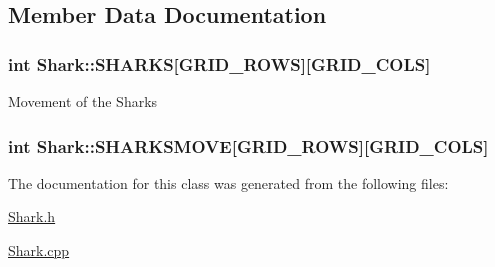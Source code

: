 \subsection{Member Data Documentation}
\subsubsection[{\texorpdfstring{S\+H\+A\+R\+KS}{SHARKS}}]{\setlength{\rightskip}{0pt plus 5cm}int Shark\+::\+S\+H\+A\+R\+KS\mbox{[}{\bf G\+R\+I\+D\+\_\+\+R\+O\+WS}\mbox{]}\mbox{[}{\bf G\+R\+I\+D\+\_\+\+C\+O\+LS}\mbox{]}}\hypertarget{class_shark_a21ce8940cbf1ded5529002c42dd01595}{}\label{class_shark_a21ce8940cbf1ded5529002c42dd01595}
Movement of the Sharks 
\subsubsection[{\texorpdfstring{S\+H\+A\+R\+K\+S\+M\+O\+VE}{SHARKSMOVE}}]{\setlength{\rightskip}{0pt plus 5cm}int Shark\+::\+S\+H\+A\+R\+K\+S\+M\+O\+VE\mbox{[}{\bf G\+R\+I\+D\+\_\+\+R\+O\+WS}\mbox{]}\mbox{[}{\bf G\+R\+I\+D\+\_\+\+C\+O\+LS}\mbox{]}}\hypertarget{class_shark_aa03f93cdce80f7dac4c26e4bb73d0547}{}\label{class_shark_aa03f93cdce80f7dac4c26e4bb73d0547}


The documentation for this class was generated from the following files\+:\begin{DoxyCompactItemize}
\item 
\hyperlink{_shark_8h}{Shark.\+h}\item 
\hyperlink{_shark_8cpp}{Shark.\+cpp}\end{DoxyCompactItemize}

